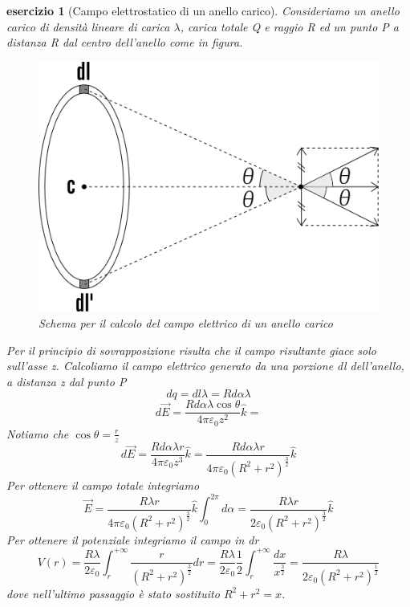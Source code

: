 \documentclass[10pt,a4paper]{article}
\newtheorem{esercizio}{esercizio}
\begin{document}
\begin{esercizio}[Campo elettrostatico di un anello carico]
Consideriamo un anello carico di densità lineare di carica $\lambda$, carica totale Q e raggio R ed un punto P a distanza R dal centro dell'anello come in figura.
\begin{figure}[h!]
	\centering
	\includegraphics[width=0.6\linewidth]{images/anello}
	\caption{Schema per il calcolo del campo elettrico di un anello carico}
	\label{fig:anello}
\end{figure}
\FloatBarrier
Per il principio di sovrapposizione risulta che il campo risultante giace solo sull'asse z. Calcoliamo il campo elettrico generato da una porzione dl dell'anello, a distanza z dal punto P
\[dq = dl\lambda = R d\alpha \lambda\] 
\[d\vec{E} = \frac{ R d\alpha\lambda \cos\theta}{4\pi\varepsilon_0z^2}\hat{k} = \]
Notiamo che $\cos\theta = \frac{r}{z}$
\[d\vec{E} = \frac{ R d\alpha\lambda r }{4\pi\varepsilon_0 z^3}\hat{k} = \frac{ R d\alpha\lambda r }{4\pi\varepsilon_0 (R^2+r^2)^{\frac{3}{2}}}\hat{k}\]
Per ottenere il campo totale integriamo 
\[\vec{E} = \frac{ R \lambda r }{4\pi\varepsilon_0 (R^2+r^2)^{\frac{3}{2}}}\hat{k}\int_{0}^{2\pi}d\alpha= \frac{ R \lambda r }{2\varepsilon_0 (R^2+r^2)^{\frac{3}{2}}}\hat{k} \]
Per ottenere il potenziale integriamo il campo in dr
\[V(r) = \frac{R \lambda}{2\varepsilon_0}\int_{r}^{+\infty}\frac{  r }{ (R^2+r^2)^{\frac{3}{2}}} dr= \frac{R \lambda}{2\varepsilon_0}\frac{1}{2}\int_{r}^{+\infty}\frac{ dx }{ x^{\frac{3}{2}}} = \frac{ R \lambda }{2\varepsilon_0 (R^2+r^2)^{\frac{1}{2}}}\]
dove nell'ultimo passaggio è stato sostituito \(R^2+r^2 = x\).
\end{esercizio}
\end{document}
